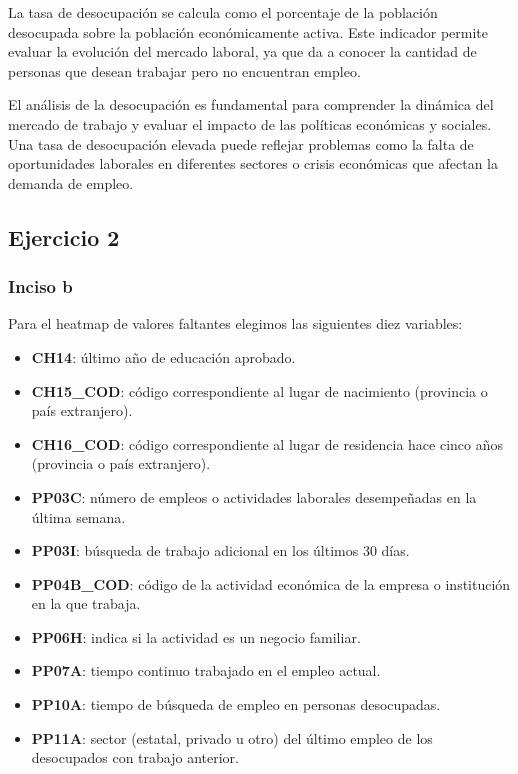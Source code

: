 \documentclass[11pt,a4paper]{article}
\begin{document}
La tasa de desocupación se calcula como el porcentaje de la población desocupada sobre la
población económicamente activa. Este indicador permite evaluar la evolución del mercado
laboral, ya que da a conocer la cantidad de personas que desean trabajar pero no encuentran
empleo.

El análisis de la desocupación es fundamental para comprender la dinámica del mercado de
trabajo y evaluar el impacto de las políticas económicas y sociales. Una tasa de desocupación
elevada puede reflejar problemas como la falta de oportunidades laborales en diferentes
sectores o crisis económicas que afectan la demanda de empleo.

\subsection*{Ejercicio 2}

\subsubsection*{Inciso b}

Para el heatmap de valores faltantes elegimos las siguientes diez variables:

\begin{itemize}
  \item \textbf{CH14}: último año de educación aprobado.
  \item \textbf{CH15\_COD}: código correspondiente al lugar de nacimiento (provincia o país extranjero).
  \item \textbf{CH16\_COD}: código correspondiente al lugar de residencia hace cinco años (provincia o país extranjero).
  \item \textbf{PP03C}: número de empleos o actividades laborales desempeñadas en la última semana.
  \item \textbf{PP03I}: búsqueda de trabajo adicional en los últimos 30 días.
  \item \textbf{PP04B\_COD}: código de la actividad económica de la empresa o institución en la que trabaja.
  \item \textbf{PP06H}: indica si la actividad es un negocio familiar.
  \item \textbf{PP07A}: tiempo continuo trabajado en el empleo actual.
  \item \textbf{PP10A}: tiempo de búsqueda de empleo en personas desocupadas.
  \item \textbf{PP11A}: sector (estatal, privado u otro) del último empleo de los desocupados con trabajo anterior.
\end{itemize}
\end{document}
